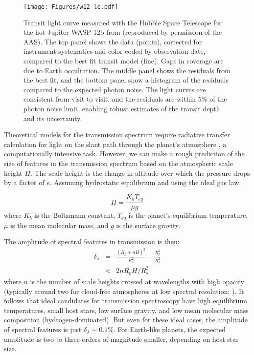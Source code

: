 \documentclass[graybox,natbib,nosecnum]{svmult}
\begin{document}
\begin{figure}
\begin{centering}
\texttt{[image: Figures/w12\_lc.pdf]}
\caption{Transit light curve measured with the Hubble Space Telescope for the hot Jupiter WASP-12b from \citealt{kreidberg15b} (reproduced by permission of the AAS). The top panel shows the data (points), corrected for instrument systematics and color-coded by observation date, compared to the best fit transit model (line). Gaps in coverage are due to Earth occultation. The middle panel shows the residuals from the best fit, and the bottom panel show a histogram of the residuals compared to the expected photon noise. The light curves are consistent from visit to visit, and the residuals are within 5\% of the photon noise limit, enabling robust estimates of the transit depth and its uncertainty.}
\label{fig:lc}       
\end{centering}
\end{figure}

Theoretical models for the transmission spectrum require radiative transfer calculation for light on the slant path through the planet's atmosphere \citep{seager00}, a computationally intensive task. However, we can make a rough prediction of the size of features in the transmission spectrum based on the atmospheric scale height $H$. The scale height is the change in altitude over which the pressure drops by a factor of $e$. Assuming hydrostatic equilibrium and using the ideal gas law,

\begin{equation}
H = \frac{K_bT_{eq}}{\mu g}
\end{equation}
where $K_b$ is the Boltzmann constant, $T_{eq}$ is the planet's equilibrium temperature, $\mu$ is the mean molecular mass, and $g$ is the surface gravity.

The amplitude of spectral features in transmission is then:
\begin{eqnarray}
\delta_\lambda &=& \frac{(R_p + nH)^2}{R_s^2} - \frac{R_p^2}{R_s^2}\\
 & \approx & 2nR_pH/R_s^2
\end{eqnarray} 
where $n$ is the number of scale heights crossed at wavelengths with high opacity (typically around two for cloud-free atmospheres at low spectral resolution; \citealt{stevenson16}). It follows that ideal candidates for transmission spectroscopy have high equilibrium temperatures, small host stars, low surface gravity, and low mean molecular mass composition (hydrogen-dominated). But even for these ideal cases, the amplitude of spectral features is just $\delta_\lambda \sim0.1\%$. For Earth-like planets, the expected amplitude is two to three orders of magnitude smaller, depending on host star size. 
\end{document}
